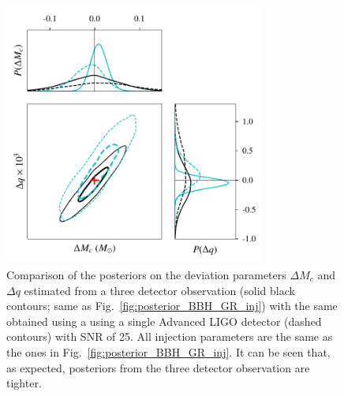\documentclass[prd,preprintnumbers,twocolumn,eqsecnum,floatfix,a4paper,nofootinbib,superscriptaddress]{revtex4}
\begin{document}
\begin{figure}[tb] \begin{center}
		\includegraphics[width=3.4in]{figs/hm_mcq_1det_3det_compare_GR.pdf}
		\caption{Comparison of the posteriors on the deviation parameters $\Delta M_c$ and $\Delta q$ estimated from a three detector observation (solid black contours; same as Fig.~\ref{fig:posterior_BBH_GR_inj}) with the same obtained using a using a single Advanced LIGO detector (dashed contours) with SNR of 25. All injection parameters are the same as the ones in Fig.~\ref{fig:posterior_BBH_GR_inj}.  It can be seen that, as expected, posteriors from the three detector observation are tighter.}
		\label{fig:hm_mcq_compare-1det_3det_GR_inj}
	\end{center} \end{figure}
\end{document}
